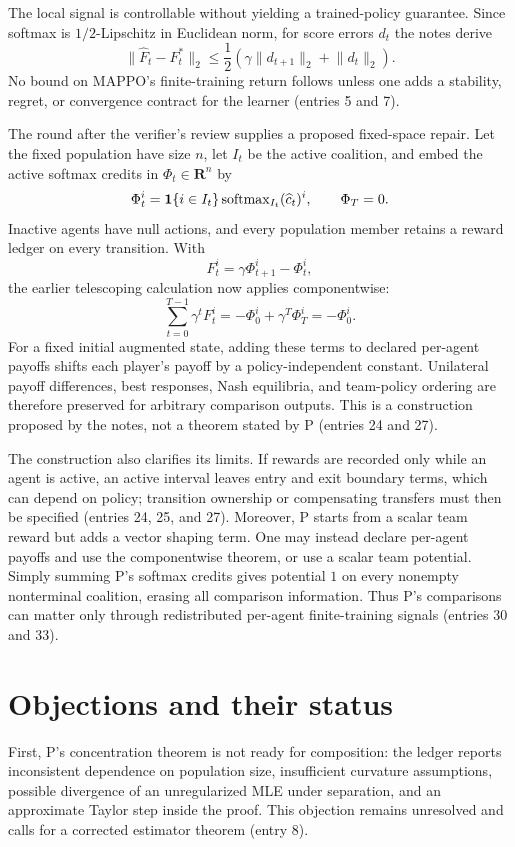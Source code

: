 \documentclass{article}
\begin{document}
The local signal is controllable without yielding a trained-policy guarantee.  Since softmax is $1/2$-Lipschitz in Euclidean norm, for score errors $d_t$ the notes derive
\[
 \lVert \widehat F_t-F_t^*\rVert_2
 \leq \frac12\left(
 \gamma\lVert d_{t+1}\rVert_2+\lVert d_t\rVert_2
 \right).
\]
No bound on MAPPO's finite-training return follows unless one adds a stability, regret, or convergence contract for the learner (entries 5 and 7).

The round after the verifier's review supplies a proposed fixed-space repair.  Let the fixed population have size $n$, let $I_t$ be the active coalition, and embed the active softmax credits in $\Phi_t\in\mathbf{R}^n$ by
\[
 \Phi_t^i={\bf 1}\{i\in I_t\}
 \operatorname{softmax}_{I_t}(\widehat c_t)^i,
 \qquad \Phi_T=0.
\]
Inactive agents have null actions, and every population member retains a reward ledger on every transition.  With
\[
 F_t^i=\gamma\Phi_{t+1}^i-\Phi_t^i,
\]
the earlier telescoping calculation now applies componentwise:
\[
 \sum_{t=0}^{T-1}\gamma^tF_t^i
 =-\Phi_0^i+\gamma^T\Phi_T^i=-\Phi_0^i.
\]
For a fixed initial augmented state, adding these terms to declared per-agent payoffs shifts each player's payoff by a policy-independent constant.  Unilateral payoff differences, best responses, Nash equilibria, and team-policy ordering are therefore preserved for arbitrary comparison outputs.  This is a construction proposed by the notes, not a theorem stated by P (entries 24 and 27).

The construction also clarifies its limits.  If rewards are recorded only while an agent is active, an active interval leaves entry and exit boundary terms, which can depend on policy; transition ownership or compensating transfers must then be specified (entries 24, 25, and 27).  Moreover, P starts from a scalar team reward but adds a vector shaping term.  One may instead declare per-agent payoffs and use the componentwise theorem, or use a scalar team potential.  Simply summing P's softmax credits gives potential $1$ on every nonempty nonterminal coalition, erasing all comparison information.  Thus P's comparisons can matter only through redistributed per-agent finite-training signals (entries 30 and 33).

\section*{Objections and their status}
First, P's concentration theorem is not ready for composition: the ledger reports inconsistent dependence on population size, insufficient curvature assumptions, possible divergence of an unregularized MLE under separation, and an approximate Taylor step inside the proof.  This objection remains unresolved and calls for a corrected estimator theorem (entry 8).
\end{document}
